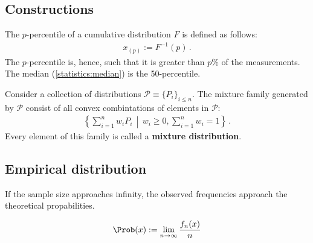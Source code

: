 \subsection{Constructions}

    \begin{definition}[Percentile]
        The $p$-percentile of a cumulative distribution $F$ is defined as follows:
        \begin{gather}
            x_{(p)} := F^{-1}(p)\,.
        \end{gather}
        The $p$-percentile is, hence, such that it is greater than $p\%$ of the measurements. The median (\cref{statistics:median}) is the 50-percentile.
    \end{definition}


    \begin{example}
        Consider a collection of distributions $\mathcal{P}\equiv\{P_i\}_{i\leq n}$. The mixture family generated by $\mathcal{P}$ consist of all convex combintations of elements in $\mathcal{P}$:
        \begin{gather}
            \left\{\sum_{i=1}^nw_iP_i\,\middle\vert\,w_i\geq0,\sum_{i=1}^nw_i = 1\right\}\,.
        \end{gather}
        Every element of this family is called a \textbf{mixture distribution}.
    \end{example}


\subsection{Empirical distribution}


    \begin{theorem}\label{statistics:large_numbers}
        If the sample size approaches infinity, the observed frequencies approach the theoretical propabilities.
    \end{theorem}
    \begin{result}
        \begin{gather}
            \label{statistics:frequentist_probability}
            \Prob(x) := \lim_{n\rightarrow\infty}\frac{f_n(x)}{n}
        \end{gather}
    \end{result}

